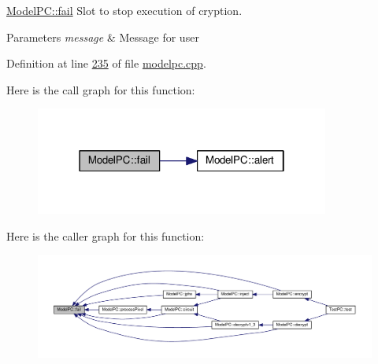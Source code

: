 \hyperlink{class_model_p_c_a47464b59b7e37fcee25e55475708aabd}{Model\-P\-C\-::fail} Slot to stop execution of cryption. 


\begin{DoxyParams}{Parameters}
{\em message} & Message for user \\
\hline
\end{DoxyParams}


Definition at line \hyperlink{modelpc_8cpp_source_l00235}{235} of file \hyperlink{modelpc_8cpp_source}{modelpc.\-cpp}.



Here is the call graph for this function\-:
\nopagebreak
\begin{figure}[H]
\begin{center}
\leavevmode
\includegraphics[width=274pt]{class_model_p_c_a47464b59b7e37fcee25e55475708aabd_cgraph}
\end{center}
\end{figure}




Here is the caller graph for this function\-:
\nopagebreak
\begin{figure}[H]
\begin{center}
\leavevmode
\includegraphics[width=350pt]{class_model_p_c_a47464b59b7e37fcee25e55475708aabd_icgraph}
\end{center}
\end{figure}


